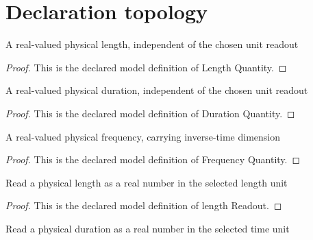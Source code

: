 \section{Declaration topology}
\begin{definition}
  \label{def:physics:phyx-mini-0187:phyxminiproblems-problemphyxmini0187-lengthquantity}
  A real-valued physical length, independent of the chosen unit readout
\end{definition}
\begin{proof}
  This is the declared model definition of Length Quantity.
\end{proof}
\begin{definition}
  \label{def:physics:phyx-mini-0187:phyxminiproblems-problemphyxmini0187-durationquantity}
  A real-valued physical duration, independent of the chosen unit readout
\end{definition}
\begin{proof}
  This is the declared model definition of Duration Quantity.
\end{proof}
\begin{definition}
  \label{def:physics:phyx-mini-0187:phyxminiproblems-problemphyxmini0187-frequencyquantity}
  A real-valued physical frequency, carrying inverse-time dimension
\end{definition}
\begin{proof}
  This is the declared model definition of Frequency Quantity.
\end{proof}
\begin{definition}
  \label{def:physics:phyx-mini-0187:phyxminiproblems-problemphyxmini0187-lengthreadout}
  Read a physical length as a real number in the selected length unit
\end{definition}
\begin{proof}
  This is the declared model definition of length Readout.
\end{proof}
\begin{definition}
  \label{def:physics:phyx-mini-0187:phyxminiproblems-problemphyxmini0187-durationreadout}
  Read a physical duration as a real number in the selected time unit
\end{definition}
